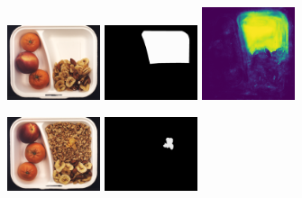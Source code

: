 \begin{figure}[H]
    \centering
    \begin{subfigure}[b]{\textwidth}
        \centering
        \begin{minipage}{0.45\textwidth}
            \centering
            \includegraphics[width=0.3\textwidth]{figures/appendix/appendix_DRAEM/BB/129.png}
            \includegraphics[width=0.3\textwidth]{figures/appendix/appendix_DRAEM/BB/129_m.png}
            \includegraphics[width=0.3\textwidth]{figures/appendix/appendix_DRAEM/BB/129_mask.png}
        \end{minipage}
        \begin{minipage}{0.45\textwidth}
            \centering
            \includegraphics[width=0.3\textwidth]{figures/appendix/appendix_DRAEM/BB/226.png}
            \includegraphics[width=0.3\textwidth]{figures/appendix/appendix_DRAEM/BB/226_m.png}

\end{minipage}
\end{subfigure}
\end{figure}
